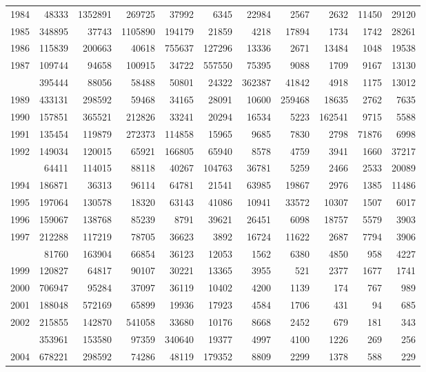 \documentclass[
]{article}
\begin{document}
\begin{longtable}[t]{lrrrrrrrrrr}
1984 & 48333 & 1352891 & 269725 & 37992 & 6345 & 22984 & 2567 & 2632 & 11450 & 29120\\
1985 & 348895 & 37743 & 1105890 & 194179 & 21859 & 4218 & 17894 & 1734 & 1742 & 28261\\
1986 & 115839 & 200663 & 40618 & 755637 & 127296 & 13336 & 2671 & 13484 & 1048 & 19538\\
1987 & 109744 & 94658 & 100915 & 34722 & 557550 & 75395 & 9088 & 1709 & 9167 & 13130\\
\addlinespace
1988 & 395444 & 88056 & 58488 & 50801 & 24322 & 362387 & 41842 & 4918 & 1175 & 13012\\
1989 & 433131 & 298592 & 59468 & 34165 & 28091 & 10600 & 259468 & 18635 & 2762 & 7635\\
1990 & 157851 & 365521 & 212826 & 33241 & 20294 & 16534 & 5223 & 162541 & 9715 & 5588\\
1991 & 135454 & 119879 & 272373 & 114858 & 15965 & 9685 & 7830 & 2798 & 71876 & 6998\\
1992 & 149034 & 120015 & 65921 & 166805 & 65940 & 8578 & 4759 & 3941 & 1660 & 37217\\
\addlinespace
1993 & 64411 & 114015 & 88118 & 40267 & 104763 & 36781 & 5259 & 2466 & 2533 & 20089\\
1994 & 186871 & 36313 & 96114 & 64781 & 21541 & 63985 & 19867 & 2976 & 1385 & 11486\\
1995 & 197064 & 130578 & 18320 & 63143 & 41086 & 10941 & 33572 & 10307 & 1507 & 6017\\
1996 & 159067 & 138768 & 85239 & 8791 & 39621 & 26451 & 6098 & 18757 & 5579 & 3903\\
1997 & 212288 & 117219 & 78705 & 36623 & 3892 & 16724 & 11622 & 2687 & 7794 & 3906\\
\addlinespace
1998 & 81760 & 163904 & 66854 & 36123 & 12053 & 1562 & 6380 & 4850 & 958 & 4227\\
1999 & 120827 & 64817 & 90107 & 30221 & 13365 & 3955 & 521 & 2377 & 1677 & 1741\\
2000 & 706947 & 95284 & 37097 & 36119 & 10402 & 4200 & 1139 & 174 & 767 & 989\\
2001 & 188048 & 572169 & 65899 & 19936 & 17923 & 4584 & 1706 & 431 & 94 & 685\\
2002 & 215855 & 142870 & 541058 & 33680 & 10176 & 8668 & 2452 & 679 & 181 & 343\\
\addlinespace
2003 & 353961 & 153580 & 97359 & 340640 & 19377 & 4997 & 4100 & 1226 & 269 & 256\\
2004 & 678221 & 298592 & 74286 & 48119 & 179352 & 8809 & 2299 & 1378 & 588 & 229\\

\end{longtable}
\end{document}
